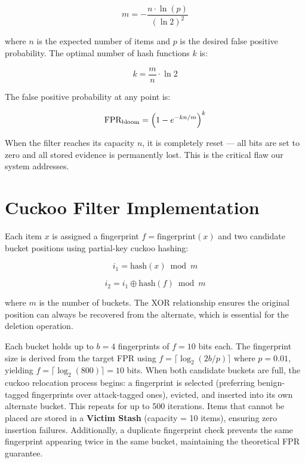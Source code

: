 \documentclass[12pt, a4paper]{report}
\begin{document}
\begin{equation}
  m = -\frac{n \cdot \ln(p)}{(\ln 2)^{2}}
\end{equation}

where $n$ is the expected number of items and $p$ is the desired false
positive probability. The optimal number of hash functions $k$ is:

\begin{equation}
  k = \frac{m}{n} \cdot \ln 2
\end{equation}

The false positive probability at any point is:

\begin{equation}
  \text{FPR}_{\text{bloom}} = \Bigl(1 - e^{-kn/m}\Bigr)^{k}
\end{equation}

When the filter reaches its capacity $n$, it is completely reset --- all
bits are set to zero and all stored evidence is permanently lost. This is
the critical flaw our system addresses.

\section{Cuckoo Filter Implementation}

Each item $x$ is assigned a fingerprint $f = \text{fingerprint}(x)$ and
two candidate bucket positions using partial-key cuckoo hashing:

\begin{equation}
  i_{1} = \text{hash}(x) \bmod m
\end{equation}

\begin{equation}
  i_{2} = i_{1} \oplus \text{hash}(f) \bmod m
\end{equation}

where $m$ is the number of buckets. The XOR relationship ensures the
original position can always be recovered from the alternate, which is
essential for the deletion operation.

Each bucket holds up to $b=4$ fingerprints of $f=10$ bits each. The
fingerprint size is derived from the target FPR using
$f = \lceil \log_{2}(2b/p) \rceil$ where $p = 0.01$, yielding
$f = \lceil \log_{2}(800) \rceil = 10$ bits. When both candidate buckets
are full, the cuckoo relocation process begins: a fingerprint is selected
(preferring benign-tagged fingerprints over attack-tagged ones), evicted,
and inserted into its own alternate bucket. This repeats for up to 500
iterations. Items that cannot be placed are stored in a \textbf{Victim
Stash} (capacity = 10 items), ensuring zero insertion failures.
Additionally, a duplicate fingerprint check prevents the same fingerprint
appearing twice in the same bucket, maintaining the theoretical FPR
guarantee.
\end{document}
